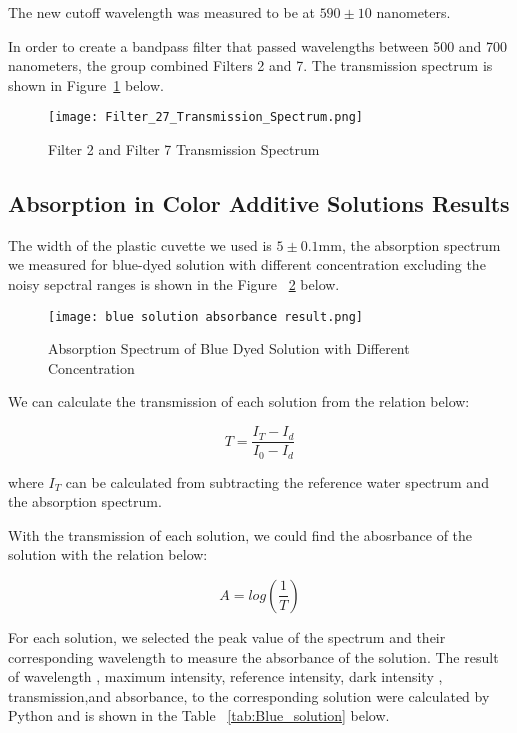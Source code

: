 \documentclass{article}
\begin{document}
The new cutoff wavelength was measured to be at $590 \pm 10 $ nanometers.

In order to create a bandpass filter that passed wavelengths between 500 and 700 nanometers, the group combined Filters 2 and 7. The transmission spectrum is shown in Figure~\ref{fig:filter 27 T spectrum} below.

\begin{figure} [h!]
    \centering
    \texttt{[image: Filter\_27\_Transmission\_Spectrum.png]}
    \caption{Filter 2 and Filter 7 Transmission Spectrum}
    \label{fig:filter 27 T spectrum}
\end{figure}

\subsection{Absorption in Color Additive Solutions Results}

The width of the plastic cuvette we used is $5 \pm 0.1 $mm, the absorption spectrum we measured for blue-dyed solution with different concentration excluding the noisy sepctral ranges is shown in the Figure ~\ref{fig:blue_dye} below. 

\begin{figure}[h!]
    \centering
    \texttt{[image: blue solution absorbance result.png]}
    \caption{Absorption Spectrum of Blue Dyed Solution with Different Concentration }
    \label{fig:blue_dye}
\end{figure}

 We can calculate the transmission of each solution from the relation below:

\begin{equation}
    T= \frac{I_{T}- I_{d}}{I_{0} - I_{d}}    
\end{equation}

where $I_{T}$ can be calculated from subtracting the reference water spectrum and the absorption spectrum. 

With the transmission of each solution, we could find the abosrbance of the solution with the relation below:

\begin{equation}
    A = log(\frac{1}{T})
\end{equation}

For each solution, we selected the peak value of the spectrum and their corresponding wavelength to measure the absorbance of the solution. The result of wavelength , maximum intensity, reference intensity, dark intensity , transmission,and absorbance, to the corresponding solution were calculated by Python and is shown in the Table ~\ref{tab:Blue_solution} below. 
\end{document}
